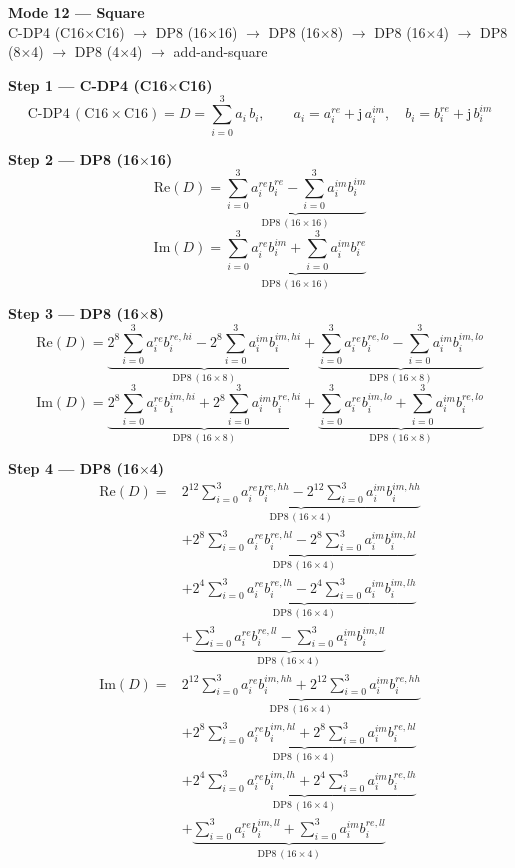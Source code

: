 \documentclass[fleqn]{article}
\newcommand{\DPop}[3]{\mathrm{DP#1}\,(#2\!\times\!#3)}
\begin{document}
\begin{center}
{\LARGE \textbf{Mode 12 --- Square}}\\[4pt]
{\large C-DP4 (C16$\times$C16) $\rightarrow$ DP8 (16$\times$16) $\rightarrow$ DP8 (16$\times$8) $\rightarrow$ DP8 (16$\times$4) $\rightarrow$ DP8 (8$\times$4) $\rightarrow$ DP8 (4$\times$4) $\rightarrow$ add-and-square}
\end{center}

\vspace{0.1em}

\textbf{Step 1 --- C-DP4 (C16$\times$C16)}
\[
\text{C-DP4}\,(\mathrm{C16}\!\times\!\mathrm{C16}) = D = \sum_{i=0}^{3} a_i \, b_i, \qquad
a_i = a_i^{re} + \mathrm{j}\,a_i^{im}, \quad
b_i = b_i^{re} + \mathrm{j}\,b_i^{im}
\]

\textbf{Step 2 --- DP8 (16$\times$16)}
\[
\mathrm{Re}(D) = \underbrace{\sum_{i=0}^{3} a_i^{re} b_i^{re}
  - \sum_{i=0}^{3} a_i^{im} b_i^{im}}_{\DPop{8}{16}{16}}
\]
\[
\mathrm{Im}(D) = \underbrace{\sum_{i=0}^{3} a_i^{re} b_i^{im}
  + \sum_{i=0}^{3} a_i^{im} b_i^{re}}_{\DPop{8}{16}{16}}
\]

\textbf{Step 3 --- DP8 (16$\times$8)}
\[
\mathrm{Re}(D) = \underbrace{2^{8}\sum_{i=0}^{3} a_i^{re} b_i^{re,hi}
  - 2^{8}\sum_{i=0}^{3} a_i^{im} b_i^{im,hi}}_{\DPop{8}{16}{8}}
  + \underbrace{\sum_{i=0}^{3} a_i^{re} b_i^{re,lo}
  - \sum_{i=0}^{3} a_i^{im} b_i^{im,lo}}_{\DPop{8}{16}{8}}
\]
\[
\mathrm{Im}(D) = \underbrace{2^{8}\sum_{i=0}^{3} a_i^{re} b_i^{im,hi}
  + 2^{8}\sum_{i=0}^{3} a_i^{im} b_i^{re,hi}}_{\DPop{8}{16}{8}}
  + \underbrace{\sum_{i=0}^{3} a_i^{re} b_i^{im,lo}
  + \sum_{i=0}^{3} a_i^{im} b_i^{re,lo}}_{\DPop{8}{16}{8}}
\]

\textbf{Step 4 --- DP8 (16$\times$4)}
\begin{align*}
\mathrm{Re}(D) = {}
  & \underbrace{2^{12}\sum_{i=0}^{3} a_i^{re} b_i^{re,hh} - 2^{12}\sum_{i=0}^{3} a_i^{im} b_i^{im,hh}}_{\DPop{8}{16}{4}} \\[0.5em]
  & + \underbrace{2^{8}\sum_{i=0}^{3} a_i^{re} b_i^{re,hl} - 2^{8}\sum_{i=0}^{3} a_i^{im} b_i^{im,hl}}_{\DPop{8}{16}{4}} \\[0.5em]
  & + \underbrace{2^{4}\sum_{i=0}^{3} a_i^{re} b_i^{re,lh} - 2^{4}\sum_{i=0}^{3} a_i^{im} b_i^{im,lh}}_{\DPop{8}{16}{4}} \\[0.5em]
  & + \underbrace{\sum_{i=0}^{3} a_i^{re} b_i^{re,ll} - \sum_{i=0}^{3} a_i^{im} b_i^{im,ll}}_{\DPop{8}{16}{4}}
\end{align*}
\begin{align*}
\mathrm{Im}(D) = {}
  & \underbrace{2^{12}\sum_{i=0}^{3} a_i^{re} b_i^{im,hh} + 2^{12}\sum_{i=0}^{3} a_i^{im} b_i^{re,hh}}_{\DPop{8}{16}{4}} \\[0.5em]
  & + \underbrace{2^{8}\sum_{i=0}^{3} a_i^{re} b_i^{im,hl} + 2^{8}\sum_{i=0}^{3} a_i^{im} b_i^{re,hl}}_{\DPop{8}{16}{4}} \\[0.5em]
  & + \underbrace{2^{4}\sum_{i=0}^{3} a_i^{re} b_i^{im,lh} + 2^{4}\sum_{i=0}^{3} a_i^{im} b_i^{re,lh}}_{\DPop{8}{16}{4}} \\[0.5em]
  & + \underbrace{\sum_{i=0}^{3} a_i^{re} b_i^{im,ll} + \sum_{i=0}^{3} a_i^{im} b_i^{re,ll}}_{\DPop{8}{16}{4}}
\end{align*}
\end{document}
